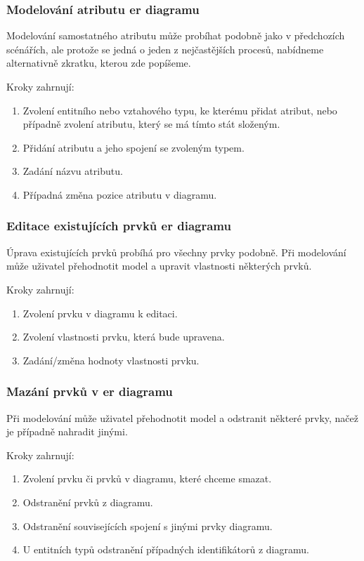 \subsubsection*{Modelování atributu \acrshort{er} diagramu}
Modelování samostatného atributu může probíhat podobně jako v předchozích scénářích, ale protože se jedná o jeden z nejčastějších procesů, nabídneme alternativně zkratku, kterou zde popíšeme.

\noindent Kroky zahrnují:
\begin{enumerate}
  \item Zvolení entitního nebo vztahového typu, ke kterému přidat atribut, nebo případně zvolení atributu, který se má tímto stát složeným.
  \item Přidání atributu a jeho spojení se zvoleným typem.
  \item Zadání názvu atributu.
  \item Případná změna pozice atributu v diagramu.
\end{enumerate}

\subsubsection*{Editace existujících prvků \acrshort{er} diagramu}
Úprava existujících prvků probíhá pro všechny prvky podobně.
Při modelování může uživatel přehodnotit model a upravit vlastnosti některých prvků.

\noindent Kroky zahrnují:
\begin{enumerate}
  \item Zvolení prvku v diagramu k editaci.
  \item Zvolení vlastnosti prvku, která bude upravena.
  \item Zadání/změna hodnoty vlastnosti prvku.
\end{enumerate}

\subsubsection*{Mazání prvků v \acrshort{er} diagramu}

Při modelování může uživatel přehodnotit model a odstranit některé prvky, načež je případně nahradit jinými.

\noindent Kroky zahrnují:
\begin{enumerate}
  \item Zvolení prvku či prvků v diagramu, které chceme smazat.
  \item Odstranění prvků z diagramu.
  \item Odstranění souvisejících spojení s jinými prvky diagramu.
  \item U entitních typů odstranění případných identifikátorů z diagramu.
\end{enumerate}

